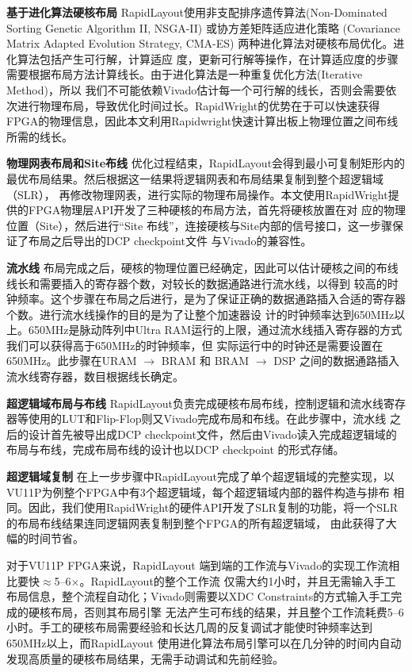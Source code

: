  {\bf 基于进化算法硬核布局}
RapidLayout使用非支配排序遗传算法(Non-Dominated Sorting Genetic Algorithm II, NSGA-II) 或协方差矩阵适应进化策略
(Covariance Matrix Adapted Evolution Strategy, CMA-ES) 两种进化算法对硬核布局优化。进化算法包括产生可行解，计算适应
度，更新可行解等操作，在计算适应度的步骤需要根据布局方法计算线长。由于进化算法是一种重复优化方法(Iterative Method)，所以
我们不可能依赖Vivado估计每一个可行解的线长，否则会需要依次进行物理布局，导致优化时间过长。RapidWright的优势在于可以快速获得
FPGA的物理信息，因此本文利用Rapidwright快速计算出板上物理位置之间布线所需的线长。

 {\bf 物理网表布局和Site布线}
优化过程结束，RapidLayout会得到最小可复制矩形内的最优布局结果。然后根据这一结果将逻辑网表和布局结果复制到整个超逻辑域（SLR），
再修改物理网表，进行实际的物理布局操作。本文使用RapidWright提供的FPGA物理层API开发了三种硬核的布局方法，首先将硬核放置在对
应的物理位置（Site），然后进行“Site 布线”，连接硬核与Site内部的信号接口，这一步骤保证了布局之后导出的DCP checkpoint文件
与Vivado的兼容性。

 {\bf 流水线}
布局完成之后，硬核的物理位置已经确定，因此可以估计硬核之间的布线线长和需要插入的寄存器个数，对较长的数据通路进行流水线，以得到
较高的时钟频率。这个步骤在布局之后进行，是为了保证正确的数据通路插入合适的寄存器个数。进行流水线操作的目的是为了让整个加速器设
计的时钟频率达到650MHz以上。650MHz是脉动阵列中Ultra RAM运行的上限，通过流水线插入寄存器的方式我们可以获得高于650MHz的时钟频率，但
实际运行中的时钟还是需要设置在650MHz。此步骤在URAM $\rightarrow$ BRAM 和 BRAM $\rightarrow$ DSP 之间的数据通路插入
流水线寄存器，数目根据线长确定。

 {\bf 超逻辑域布局与布线}
RapidLayout负责完成硬核布局布线，控制逻辑和流水线寄存器等使用的LUT和Flip-Flop则又Vivado完成布局和布线。在此步骤中，流水线
之后的设计首先被导出成DCP checkpoint文件，然后由Vivado读入完成超逻辑域的布局与布线，完成布局布线的设计也以DCP checkpoint
的形式存储。

 {\bf 超逻辑域复制}
在上一步步骤中RapidLayout完成了单个超逻辑域的完整实现，以VU11P为例整个FPGA中有3个超逻辑域，每个超逻辑域内部的器件构造与排布
相同。因此，我们使用RapidWright的硬件API开发了SLR复制的功能，将一个SLR的布局布线结果连同逻辑网表复制到整个FPGA的所有超逻辑域，
由此获得了大幅的时间节省。

对于VU11P FPGA来说，RapidLayout 端到端的工作流与Vivado的实现工作流相比要快$\approx$5--6$\times$。RapidLayout的整个工作流
仅需大约1小时，并且无需输入手工布局信息，整个流程自动化；Vivado则需要以XDC Constraints的方式输入手工完成的硬核布局，否则其布局引擎
无法产生可布线的结果，并且整个工作流耗费5--6小时。手工的硬核布局需要经验和长达几周的反复调试才能使时钟频率达到650MHz以上，而RapidLayout
使用进化算法布局引擎可以在几分钟的时间内自动发现高质量的硬核布局结果，无需手动调试和先前经验。


